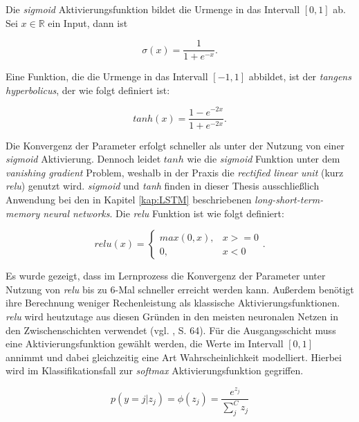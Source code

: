 \documentclass[a4paper,11pt]{article}
\begin{document}
Die \textit{sigmoid} Aktivierungsfunktion bildet die Urmenge in das Intervall $\left[0, 1\right]$ ab. Sei $x \in \mathbb{R}$ ein Input, dann ist 

\[\sigma(x) =  \frac{1}{1+ e^{-x}}.\]

Eine Funktion, die die Urmenge in das Intervall $\left[-1, 1\right]$ abbildet, ist der \textit{tangens hyperbolicus}, der wie folgt definiert ist:

\[tanh(x) =  \frac{1- e^{-2x}}{1+ e^{-2x}}.\]


Die Konvergenz der Parameter erfolgt schneller als unter der Nutzung von einer \textit{sigmoid} Aktivierung. Dennoch leidet $tanh$ wie die \textit{sigmoid} Funktion unter dem \textit{vanishing gradient} Problem, weshalb in der Praxis die \textit{rectified linear unit} (kurz \textit{relu}) genutzt wird. \textit{sigmoid} und \textit{tanh} finden in dieser Thesis ausschließlich Anwendung bei den in Kapitel \ref{kap:LSTM} beschriebenen \textit{long-short-term-memory neural networks}. Die \textit{relu} Funktion ist wie folgt definiert:

\[relu(x) = 
\begin{cases}
max(0,x), & x >= 0 \\
0, & x <0
\end{cases}{}
.\]

Es wurde gezeigt, dass im Lernprozess die Konvergenz der Parameter unter Nutzung von \textit{relu} bis zu 6-Mal schneller erreicht werden kann. Außerdem benötigt ihre Berechnung weniger Rechenleistung als klassische Aktivierungsfunktionen. \textit{relu} wird heutzutage aus diesen Gründen in den meisten neuronalen Netzen in den Zwischenschichten verwendet (vgl. \cite{deepEssentials}, S. 64). Für die Ausgangsschicht muss eine Aktivierungsfunktion gewählt werden, die Werte im Intervall $\left[0, 1\right]$ annimmt und dabei gleichzeitig eine Art Wahrscheinlichkeit modelliert. Hierbei wird im Klassifikationsfall zur \textit{softmax} Aktivierungsfunktion gegriffen. 

\[p(y = j |z_j) = \phi(z_j) = \frac{e^{z_j}}{\sum_j^C z_j} \]
\end{document}
